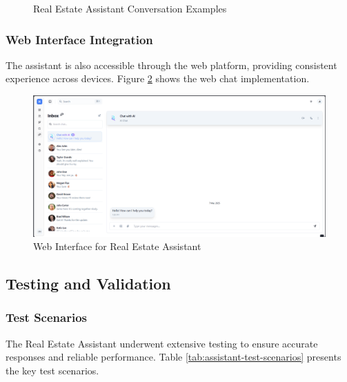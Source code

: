 \begin{figure}[htbp]
    \centering
    \caption{Real Estate Assistant Conversation Examples}
    \label{fig:assistant-conversation-examples}
\end{figure}

\subsubsection{Web Interface Integration}
The assistant is also accessible through the web platform, providing consistent experience across devices. Figure \ref{fig:assistant-web-interface} shows the web chat implementation.

\newpage

\begin{figure}[htbp]
    \centering
    \includegraphics[width=1\textwidth]{images/assistant_web_interface.png}
    \caption{Web Interface for Real Estate Assistant}
    \label{fig:assistant-web-interface}
\end{figure}

\subsection{Testing and Validation}
\subsubsection{Test Scenarios}
The Real Estate Assistant underwent extensive testing to ensure accurate responses and reliable performance. Table \ref{tab:assistant-test-scenarios} presents the key test scenarios.

